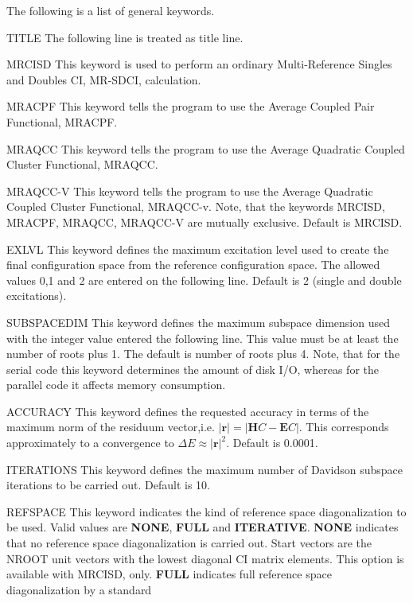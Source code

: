 The following is a list of general keywords.
\begin{keywordlist}
\item[TITLE]
The following line is treated as title line.
\item[MRCISD]
This keyword is used to perform an ordinary Multi-{}Reference
Singles and Doubles CI, MR-{}SDCI, calculation. 
\item[MRACPF]
This keyword tells the program to use the Average Coupled Pair
Functional, MRACPF.
\item[MRAQCC]
This keyword tells the program to use the Average Quadratic Coupled Cluster 
Functional, MRAQCC.
\item[MRAQCC-V]
This keyword tells the program to use the Average Quadratic Coupled Cluster
Functional, MRAQCC-v.
Note, that the keywords MRCISD, MRACPF, MRAQCC, MRAQCC-V are mutually 
exclusive. Default is MRCISD.
\item[EXLVL]
This keyword defines the maximum excitation level used to create the final 
configuration space from the reference configuration space. The allowed
values 0,1 and 2 are entered on the following line. Default is 2
(single and double excitations). 
\item[SUBSPACEDIM]
This keyword defines the maximum subspace dimension used with the
integer value entered the following line. This value
must be at least the number of roots plus 1. The default is 
number of roots plus 4. Note, that for the serial code  this keyword determines 
the amount of disk I/O, whereas for the parallel code it affects memory consumption. 
\item[ACCURACY] 
This keyword defines the requested accuracy in terms of the maximum norm
of the residuum vector,i.e. $|{\mathbf r}|=|{\mathbf HC}-{\mathbf EC}|$. This corresponds 
approximately to a convergence to $\Delta E\approx |{\mathbf r}|^2$. Default 
is 0.0001.  
\item[ITERATIONS] 
This keyword defines the maximum number of Davidson subspace
iterations to be carried out.
Default is 10. 
\item[REFSPACE]
This keyword indicates the kind of reference space diagonalization 
to be used. Valid values are {\bf NONE}, {\bf FULL} and {\bf ITERATIVE}. 
{\bf NONE} indicates that no reference space diagonalization is carried
out. Start vectors are the NROOT unit vectors with the lowest diagonal 
CI matrix elements. This option is available with MRCISD, only. 
{\bf FULL} indicates full reference space diagonalization by a standard

\end{keywordlist}
